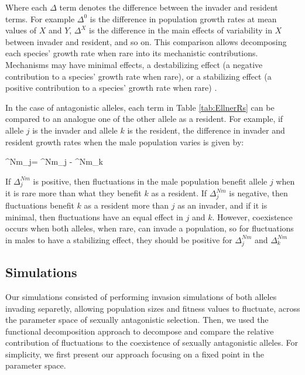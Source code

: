 \documentclass[12pt]{article}
\let\oldequation\equation
\let\oldendequation\endequation
\renewenvironment{equation}
  {\linenomathNonumbers\oldequation}
  {\oldendequation\endlinenomath}
\begin{document}
Where each $\Delta$ term denotes the difference between the invader and resident terms. For example $\Delta^{0}$  is the difference in population growth rates at mean values of $X$ and $Y$, $\Delta^{X}$ is the difference in the main effects of variability in $X$ between invader and resident, and so on. This comparison allows decomposing each species' growth rate when rare into its mechanistic contributions. Mechanisms may have minimal effects, a destabilizing effect (a negative contribution to a species' growth rate when rare), or a stabilizing effect (a positive contribution to a species' growth rate when rare) \citep{shoemaker2020}.

In the case of antagonistic alleles, each term in Table \ref{tab:EllnerRs} can be compared to an analogue one of the other allele as a resident. For example, if allele $j$ is the invader and allele $k$ is the resident, the difference in invader and resident growth rates when the male population varies is given by:


\begin{equation}
\Delta^{Nm}_{j}= ^{Nm}_{j} - ^{Nm}_{k}
\label{delta}
\end{equation}

If $\Delta^{Nm}_{j}$ is positive, then fluctuations in the male population benefit allele $j$ when it is rare more than what they benefit $k$ as a resident. If $\Delta^{Nm}_{j}$ is negative, then fluctuations benefit $k$ as a resident more than $j$ as an invader, and if it is minimal, then fluctuations have an equal effect in $j$ and $k$. However, coexistence occurs when both alleles, when rare, can invade a population, so for fluctuations in males to have a stabilizing effect, they should be positive for $\Delta^{Nm}_{j}$ and $\Delta^{Nm}_{k}$

\subsection*{Simulations}

Our simulations consisted of performing  invasion simulations of both alleles invading separetly, allowing population sizes and fitness values to fluctuate, across the parameter space of sexually antagonistic selection. Then, we used the functional decomposition approach to decompose and compare the relative contribution of fluctuations to the coexistence of sexually antagonistic alleles. For simplicity, we first present our approach focusing on a fixed point in the parameter space.
\end{document}
